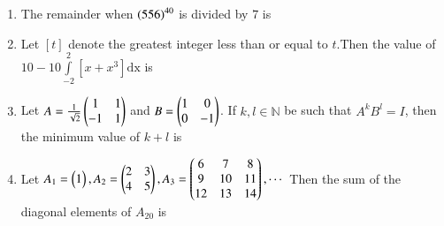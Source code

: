 \documentclass[journal]{IEEEtran}
\begin{document}
\begin{enumerate}[start=16]
\item The remainder when $\left(556\right)^{40}$ is divided by $7$ is \underline{\hspace{1cm}}\\

\item Let ${[t]}$ denote the greatest integer less than or equal to $t$.Then the value of $10-10\int\limits_{-2}^{2}{[x+x^3]}\text{dx}$ is \underline{\hspace{1cm}}\\

\item Let $A=\frac{1}{\sqrt{2}}\begin{pmatrix}1&1\\-1&1\end{pmatrix}$ and $B=\begin{pmatrix}1&0\\0&-1\end{pmatrix}$. If $k, l \in \mathbb N$ be such that $A^{k}B^{l}=I$, then the minimum value of $k+l$ is \underline{\hspace{1cm}}\\

\item Let $A_1=\begin{pmatrix}1\end{pmatrix}, A_2=\begin{pmatrix}2&3\\4&5\end{pmatrix},A_3=\begin{pmatrix}6&7&8\\9&10&11\\12&13&14\end{pmatrix},\cdots$ Then the sum of the diagonal elements of $A_{20}$ is \underline{\hspace{1cm}}\\

\end{enumerate}
\end{document}
